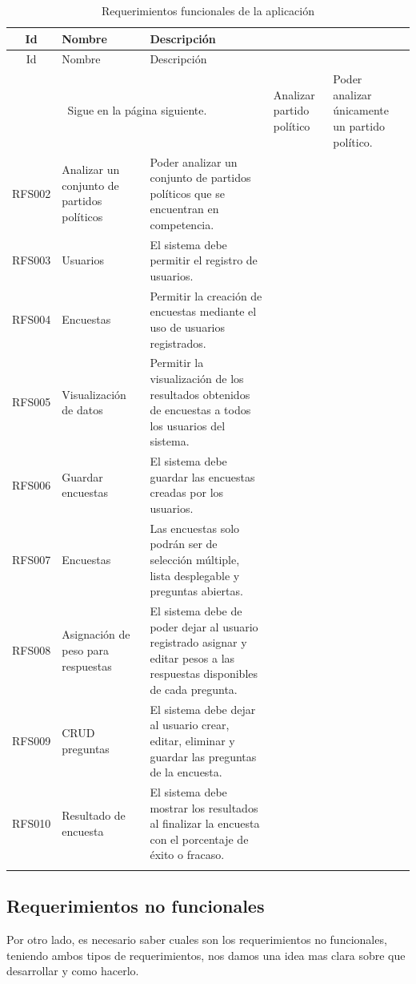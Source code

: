 \begin{longtable}{|c|m{4cm}|m{9.5cm}|}
    \hline
    \rowcolor[HTML]{3531FF} 
    {\color[HTML]{FFFFFF} Id} &{\color[HTML]{FFFFFF}Nombre} & {\color[HTML]{FFFFFF} Descripción} \\ \hline
    \endfirsthead
    \hline
    \rowcolor[HTML]{3531FF} 
    {\color[HTML]{FFFFFF} Id} &{\color[HTML]{FFFFFF}Nombre} & {\color[HTML]{FFFFFF} Descripción} \\
    \hline 
    \endhead
    \multicolumn{3}{c}{Sigue en la página siguiente.}
    \endfoot
    \endlastfoot
    RFS001&Analizar partido político&Poder analizar únicamente un partido político.\\ \hline
    RFS002&Analizar un conjunto de partidos políticos&Poder analizar un conjunto de partidos políticos que se encuentran en competencia. \\ \hline
    RFS003&Usuarios&El sistema debe permitir el registro de usuarios. \\ \hline
    RFS004&Encuestas&Permitir la creación de encuestas mediante el uso de usuarios registrados. \\ \hline
    RFS005&Visualización de datos&Permitir la visualización de los resultados obtenidos de encuestas a todos los usuarios del sistema. \\ \hline
    RFS006&Guardar encuestas&El sistema debe guardar las encuestas creadas por los usuarios. \\\hline
    RFS007&Encuestas&Las encuestas solo podrán ser de selección múltiple, lista desplegable y preguntas abiertas. \\ \hline
    RFS008&Asignación de peso para respuestas&El sistema debe de poder dejar al usuario registrado asignar y editar pesos a las respuestas disponibles de cada pregunta. \\ \hline
    RFS009&CRUD preguntas&El sistema debe dejar al usuario crear, editar, eliminar y guardar las preguntas de la encuesta. \\ \hline
    RFS010&Resultado de encuesta&El sistema debe mostrar los resultados al finalizar la encuesta con el porcentaje de éxito o fracaso.\\ \hline
    \caption{Requerimientos funcionales de la aplicación}
    \label{table:RFS}
\end{longtable}
\subsection{Requerimientos no funcionales}
Por otro lado, es necesario saber cuales son los requerimientos no funcionales, teniendo ambos tipos de requerimientos, nos damos una idea mas clara sobre que desarrollar y como hacerlo.

